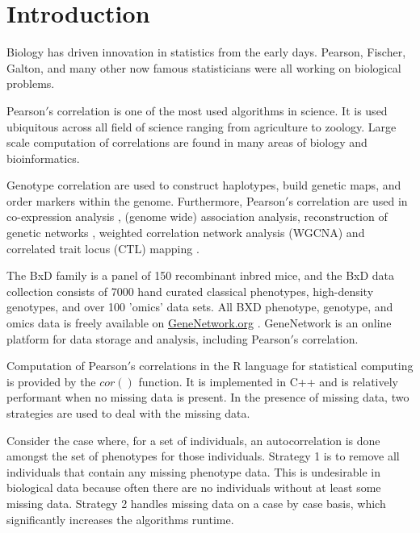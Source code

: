 \documentclass{bioinfo}
\begin{document}
\maketitle

\section{Introduction}
Biology has driven innovation in statistics from the early days. Pearson, Fischer, 
Galton, and many other now famous statisticians were all working on biological 
problems. 

\enlargethispage{12pt}

Pearson$'$s correlation is one of the most used algorithms in science. It is used 
ubiquitous across all field of science ranging from agriculture to zoology. Large 
scale computation of correlations are found in many areas of biology and 
bioinformatics. 

Genotype correlation are used to construct haplotypes, build genetic maps, and 
order markers within the genome. Furthermore, Pearson$'$s correlation are used in 
co-expression analysis \citep{Tesson:2010}, (genome wide) association analysis, 
reconstruction of genetic networks \citep{Fukushima:2013}, weighted correlation 
network analysis (WGCNA) \citep{Horvath:2008} and correlated trait locus (CTL) 
mapping \citep{Arends2016a}.

The BxD family is a panel of 150 recombinant inbred mice, and the BxD data collection 
consists of 7000 hand curated classical phenotypes, high-density genotypes, and over 
100 'omics' data sets. All BXD phenotype, genotype, and omics data is freely available on 
\href{https://genenetwork.org/}{GeneNetwork.org} \citep{Sloan2016}. GeneNetwork is an 
online platform for data storage and analysis, including Pearson$'$s correlation.

Computation of Pearson$'$s correlations in the R language for statistical computing 
\citep{R:2005} is provided by the $cor()$ function. It is implemented in C++ and is 
relatively performant when no missing data is present. In the presence of missing 
data, two strategies are used to deal with the missing data.

Consider the case where, for a set of individuals, an autocorrelation is done 
amongst the set of phenotypes for those individuals. Strategy 1 is to remove 
all individuals that contain any missing phenotype data. This is undesirable in 
biological data because often there are no individuals without at least some 
missing data. Strategy 2 handles missing data on a case by case basis, 
which significantly increases the algorithms runtime.
\end{document}

